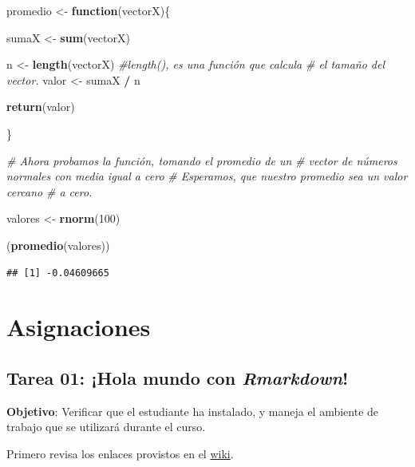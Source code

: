 \documentclass[12pt,letterpaper,]{book}
\newenvironment{Shaded}{\begin{snugshade}}{\end{snugshade}}
\newcommand{\KeywordTok}[1]{\textcolor[rgb]{0.13,0.29,0.53}{\textbf{#1}}}
\newcommand{\DecValTok}[1]{\textcolor[rgb]{0.00,0.00,0.81}{#1}}
\newcommand{\StringTok}[1]{\textcolor[rgb]{0.31,0.60,0.02}{#1}}
\newcommand{\CommentTok}[1]{\textcolor[rgb]{0.56,0.35,0.01}{\textit{#1}}}
\newcommand{\ControlFlowTok}[1]{\textcolor[rgb]{0.13,0.29,0.53}{\textbf{#1}}}
\newcommand{\OperatorTok}[1]{\textcolor[rgb]{0.81,0.36,0.00}{\textbf{#1}}}
\newcommand{\NormalTok}[1]{#1}
\begin{document}
\begin{Shaded}
\begin{Highlighting}[]
\NormalTok{promedio <-}\StringTok{ }\ControlFlowTok{function}\NormalTok{(vectorX)\{}
 
\NormalTok{   sumaX <-}\StringTok{ }\KeywordTok{sum}\NormalTok{(vectorX)}
   
\NormalTok{  n <-}\StringTok{ }\KeywordTok{length}\NormalTok{(vectorX) }\CommentTok{#length(), es una función que calcula }
                       \CommentTok{#   el tamaño del vector.}
\NormalTok{  valor <-}\StringTok{ }\NormalTok{sumaX }\OperatorTok{/}\StringTok{ }\NormalTok{n }
  
  \KeywordTok{return}\NormalTok{(valor)}
  
\NormalTok{\}}

\CommentTok{# Ahora probamos la función, tomando el promedio de un }
\CommentTok{#       vector de números normales con media igual a cero}
\CommentTok{#       Esperamos, que nuestro promedio sea un valor cercano}
\CommentTok{#         a cero.}

\NormalTok{valores <-}\StringTok{ }\KeywordTok{rnorm}\NormalTok{(}\DecValTok{100}\NormalTok{)}

\NormalTok{(}\KeywordTok{promedio}\NormalTok{(valores))}
\end{Highlighting}
\end{Shaded}

\begin{verbatim}
## [1] -0.04609665
\end{verbatim}

\chapter{Asignaciones}\label{asignaciones}

\section{\texorpdfstring{Tarea 01: ¡Hola mundo con
\emph{Rmarkdown}!}{Tarea 01: ¡Hola mundo con Rmarkdown!}}\label{tarea-01-hola-mundo-con-rmarkdown}

\textbf{Objetivo}: Verificar que el estudiante ha instalado, y maneja el
ambiente de trabajo que se utilizará durante el curso.

Primero revisa los enlaces provistos en el
\href{https://github.com/dawidh15/dinPob/wiki/02-Instalaci\%C3\%B3n-del-software-necesario\#prueba-con-rmarkdown}{wiki}.
\end{document}
